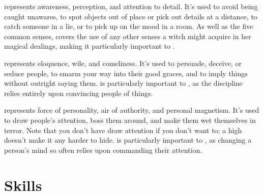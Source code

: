 

 represents awareness, perception, and attention to detail.
It's used to avoid being caught unawares, to spot objects out of place or pick out details at a distance, to catch someone in a lie, or to pick up on the mood in a room.
As well as the five common senses,  covers the use of any other senses a witch might acquire in her magical dealings, making it particularly important to .



 represents eloquence, wile, and comeliness.
It's used to persuade, deceive, or seduce people, to smarm your way into their good graces, and to imply things without outright saying them.
 is particularly important to , as the discipline relies entirely upon convincing people of things.



 represents force of personality, air of authority, and personal magnetism.
It's used to draw people's attention, boss them around, and make them wet themselves in terror.
Note that you don't have draw attention if you don't want to; a high  doesn't make it any harder to hide.
 is particularly important to , as changing a person's mind so often relies upon commanding their attention.


\section{Skills}




